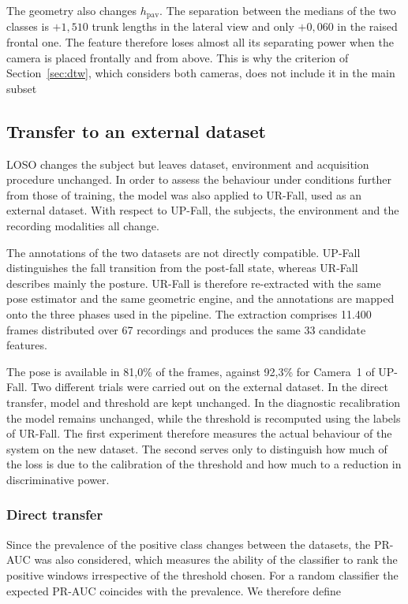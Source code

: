 The geometry also changes $h_{\text{pav}}$. The separation between the medians of the two classes is $+1{,}510$ trunk lengths in the lateral view and only $+0{,}060$ in the raised frontal one. The feature therefore loses almost all its separating power when the camera is placed frontally and from above. This is why the criterion of Section~\ref{sec:dtw}, which
considers both cameras, does not include it in the main subset

\subsection{Transfer to an external dataset}
\label{sec:domainshift}

LOSO changes the subject but leaves dataset, environment and acquisition procedure unchanged. In order to assess the behaviour under conditions further from those of training, the model was also applied to UR-Fall, used as an external dataset. With respect to UP-Fall, the subjects, the environment and the recording modalities all change.

The annotations of the two datasets are not directly compatible. UP-Fall distinguishes the fall transition from the post-fall state, whereas UR-Fall describes mainly the posture. UR-Fall is therefore re-extracted with the same pose estimator and the same geometric engine, and the annotations are mapped onto the three phases used in the pipeline. The extraction comprises 11.400 frames distributed over 67 recordings and produces the same 33 candidate features.

The pose is available in 81,0\% of the frames, against 92,3\% for Camera~1 of UP-Fall. Two different trials were carried out on the external dataset. In the direct transfer, model and threshold are kept unchanged. In the diagnostic recalibration the model remains unchanged, while the threshold is recomputed using the labels of UR-Fall. The first experiment therefore measures the actual behaviour of the system on the new dataset. The second serves only to distinguish how much of the loss is due to the calibration of the threshold and how much to a reduction in discriminative power.

\subsubsection{Direct transfer}
\label{sec:esterno}
Since the prevalence of the positive class changes between the datasets, the PR-AUC was also considered, which measures the ability of the classifier to rank the positive windows irrespective of the threshold chosen. For a random classifier the expected PR-AUC coincides with the prevalence. We therefore define


